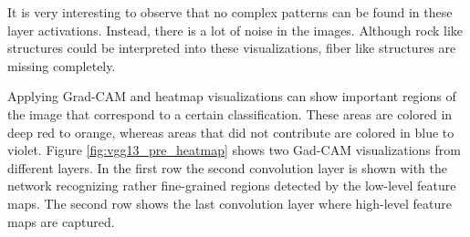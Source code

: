 \begin{figure}[!h]
\label{fig:vgg13_fromscratch_filters}
\end{figure}

\quad

It is very interesting to observe that no complex patterns can be found in these layer activations. Instead, there is a lot of noise in the images. Although rock like structures could be interpreted into these visualizations, fiber like structures are missing completely.

Applying Grad-CAM and heatmap visualizations can show important regions of the image that correspond to a certain classification. These areas are colored in deep red to orange, whereas areas that did not contribute are colored in blue to violet. Figure \ref{fig:vgg13_pre_heatmap} shows two Gad-CAM visualizations from different layers. In the first row the second convolution layer is shown with the network recognizing rather fine-grained regions detected by the low-level feature maps. The second row shows the last convolution layer where high-level feature maps are captured. \\


